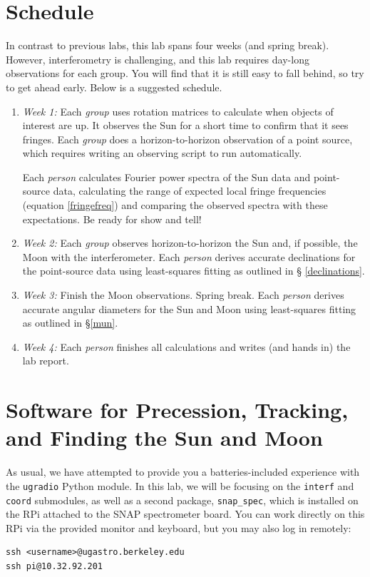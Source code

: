\documentclass[11pt,preprint]{aastex}
\begin{document}
\section{Schedule}

\noindent
In contrast to previous labs, this lab spans four weeks (and spring break).
However, interferometry is challenging, and this lab requires day-long
observations for each group. You will find that it is still easy to fall
behind, so try to get ahead early. Below is a suggested schedule.

\begin{enumerate}

\item {\it Week 1:} Each {\it group} uses rotation
  matrices to calculate when objects of interest are up. It observes the
  Sun for a short time to confirm that it sees fringes. Each {\it group}
  does a horizon-to-horizon observation of a point source, which
  requires writing an observing script to run automatically.

Each {\it person} calculates Fourier power spectra of the Sun data and
point-source data, calculating the range of expected
local fringe frequencies (equation \ref{fringefreq}) and comparing the
observed spectra with these expectations. Be ready for show and tell!

\item {\it Week 2:} Each {\it group} observes
  horizon-to-horizon the Sun and, if possible, the Moon with the
  interferometer.  Each {\it person} derives accurate declinations for
  the point-source data using least-squares fitting as outlined in \S
  \ref{declinations}.

\item {\it Week 3:} Finish the Moon observations. Spring
  break. Each {\it person} derives accurate angular diameters for the
  Sun and Moon using least-squares fitting as outlined in \S \ref{mun}.

\item {\it Week 4:} Each {\it person} finishes all
  calculations and writes (and hands in) the lab report.

\end{enumerate}

\section{Software for Precession, Tracking, and Finding the Sun and Moon}

\noindent
As usual, we have attempted to provide you a batteries-included experience with
the {\tt ugradio} Python module. In this lab, we will be focusing on the
{\tt interf} and {\tt coord} submodules, as well as a second package,
{\tt snap\_spec}, which is installed on the RPi attached to the SNAP spectrometer
board. You can work directly on this RPi via the provided monitor and keyboard,
but you may also log in remotely:
\begin{verbatim}
ssh <username>@ugastro.berkeley.edu
ssh pi@10.32.92.201
\end{verbatim}
\end{document}
